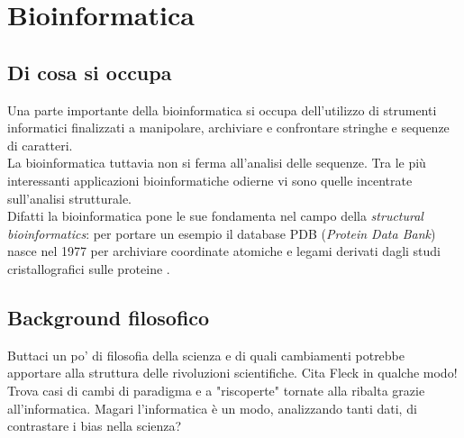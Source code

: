 \chapter{Bioinformatica}
\section{Di cosa si occupa}
\par Una parte importante della bioinformatica si occupa dell'utilizzo di strumenti informatici finalizzati a manipolare, archiviare e confrontare stringhe e sequenze di caratteri.\\
La bioinformatica tuttavia non si ferma all’analisi delle sequenze. Tra le più interessanti applicazioni bioinformatiche odierne vi sono quelle incentrate sull’analisi strutturale. \\
Difatti la bioinformatica pone le sue fondamenta nel campo della \textit{structural bioinformatics}: per portare un esempio il database PDB (\textit{Protein Data Bank}) nasce nel 1977 per archiviare coordinate atomiche e legami derivati dagli studi cristallografici sulle proteine \parencite{bernstein77}. \par

\section{Background filosofico}
Buttaci un po' di filosofia della scienza e di quali cambiamenti potrebbe apportare alla struttura delle rivoluzioni scientifiche. Cita Fleck in qualche modo!
Trova casi di cambi di paradigma e a "riscoperte" tornate alla ribalta grazie all'informatica. Magari l'informatica è un modo, analizzando tanti dati, di contrastare i bias nella scienza?